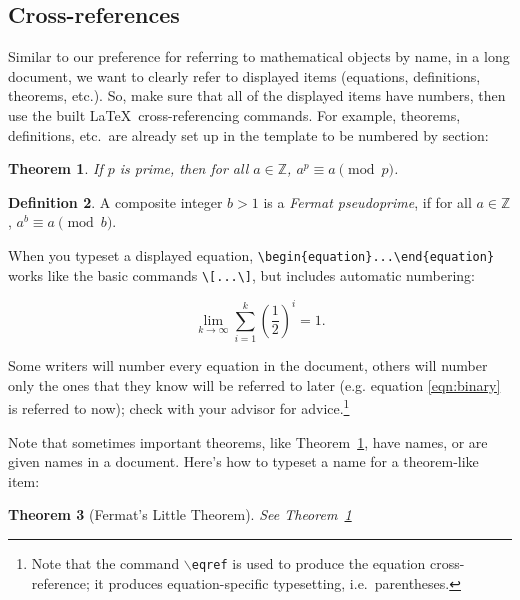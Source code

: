 \documentclass[11pt]{amsart}
\theoremstyle{theorem} %
\newtheorem{thm}{Theorem}[section] %
\theoremstyle{definition}                  %
\newtheorem{defn}[thm]{Definition}
\theoremstyle{example}                       %
\theoremstyle{remark}                       %
\numberwithin{equation}{section}
\newcommand{\Z}{\mathbb{Z}}
\begin{document}
\subsection{Cross-references}
Similar to our preference for referring to mathematical objects by name, in a long document, we want to clearly refer to displayed items (equations, definitions, theorems, etc.).  So, make sure that all of the displayed items have numbers, then use the built \LaTeX\ cross-referencing commands.
For example, theorems, definitions, etc.\ are already set up in the template to be numbered by section:

\begin{thm} \label{thm:fermat}
If $p$ is prime, then for all $a\in \Z$, $a^p \equiv a \pmod{p}$. %
\end{thm}

\begin{defn}
A composite integer $b>1$ is a \emph{Fermat pseudoprime}, if for all $a\in \Z$, $a^b \equiv a \pmod{b}$.
\end{defn}

When you typeset a displayed equation, \verb+\begin{equation}...\end{equation}+ works like the basic commands  \verb+\[...\]+, but includes automatic numbering:

\begin{equation} \label{eqn:binary}
 \lim_{k \rightarrow \infty} \sum_{i=1}^{k} \left( \frac{1}{2}\right)^i = 1.
\end{equation}

Some writers will number every equation in the document, others will number only the ones that they know will be referred to later 
(e.g. equation \eqref{eqn:binary} is referred to now); 
check with your advisor for advice.\footnote{Note that the command \texttt{$\backslash$eqref} is used to produce the equation cross-reference; it produces equation-specific typesetting, i.e.\ parentheses.}

Note that sometimes important theorems, like Theorem~\ref{thm:fermat}, have names, or are given names in a document. Here's how to typeset a name for a theorem-like item:

\begin{thm}[Fermat's Little Theorem]\label{thm:flt}
See Theorem~\ref{thm:fermat}
\end{thm}
\end{document}
